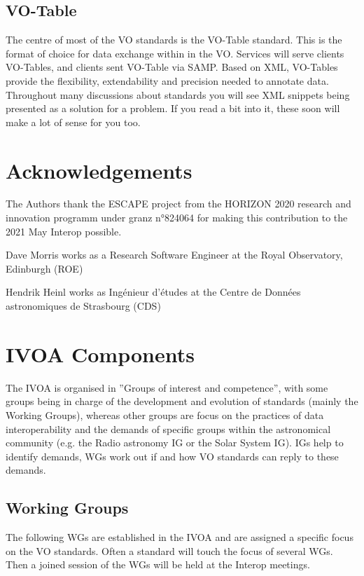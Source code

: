 \documentclass[twoside]{article}[12pt]
\begin{document}
\subsection*{VO-Table}
The centre of most of the VO standards is the VO-Table standard. This is
the format of choice for data exchange within in the VO. Services will
serve clients VO-Tables, and clients sent VO-Table via SAMP. Based on
XML, VO-Tables provide the flexibility, extendability and precision
needed to annotate data. Throughout many discussions about standards you
will see XML snippets being presented as a solution for a problem. If
you read a bit into it, these soon will make a lot of sense for you too. 


\section {Acknowledgements}
The Authors thank the ESCAPE project from the HORIZON 2020 research and
innovation programm under granz n°824064 for making this contribution to the
2021 May Interop possible. 

Dave Morris works as a Research Software Engineer at the Royal Observatory,
Edinburgh (ROE)

Hendrik Heinl works as Ingénieur d'études at the Centre de Données
astronomiques de Strasbourg (CDS)


\section{IVOA Components}

The IVOA is organised in ''Groups of interest and competence'', with
some groups being in charge of the development and evolution of
standards (mainly the Working Groups), whereas other groups are focus on
the practices of data interoperability and the demands of specific
groups within the astronomical community (e.g. the Radio astronomy IG or
the Solar System IG). IGs help to identify demands, WGs work out if and how VO
standards can reply to these demands. 

\subsection*{Working Groups}
The following WGs are established in the IVOA and are assigned a
specific focus on the VO standards. Often a standard will touch the
focus of several WGs. Then a joined session of the WGs will be held at
the Interop meetings. 

\APPS  
\DAL
\DATAMODEL
\GWS
\REGISTRY 
\SEMANTICS
 
\end{document}
